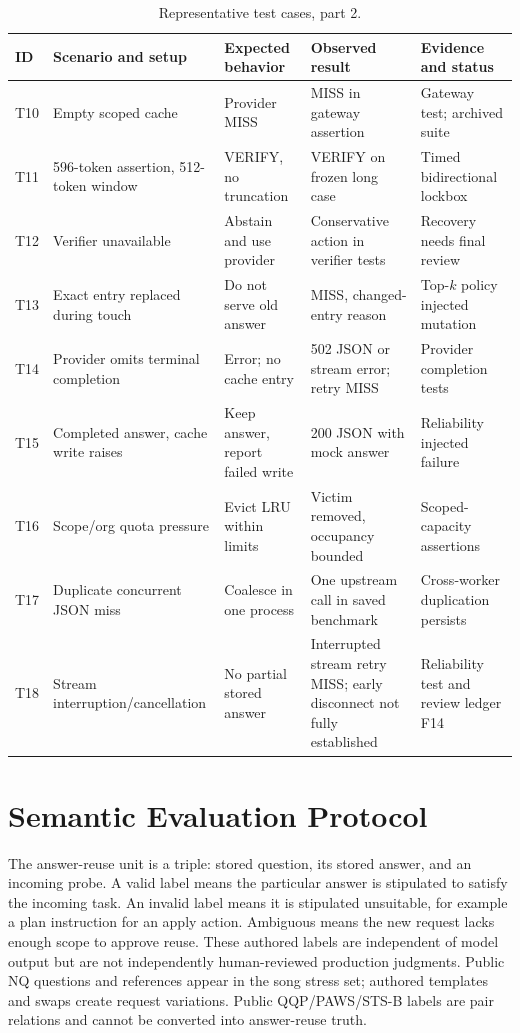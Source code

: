 \begin{table}[p]\centering\footnotesize
\caption{Representative test cases, part 2.}\label{tab:representative_cases_b}
\begin{tabular}{p{0.8cm}p{2.4cm}p{2.6cm}p{2.5cm}p{3.3cm}}
\toprule ID & Scenario and setup & Expected behavior & Observed result & Evidence and status \\\midrule
T10 & Empty scoped cache & Provider MISS & MISS in gateway assertion & Gateway test; archived suite \\
T11 & 596-token assertion, 512-token window & VERIFY, no truncation & VERIFY on frozen long case & Timed bidirectional lockbox \\
T12 & Verifier unavailable & Abstain and use provider & Conservative action in verifier tests & Recovery needs final review \\
T13 & Exact entry replaced during touch & Do not serve old answer & MISS, changed-entry reason & Top-$k$ policy injected mutation \\
T14 & Provider omits terminal completion & Error; no cache entry & 502 JSON or stream error; retry MISS & Provider completion tests \\
T15 & Completed answer, cache write raises & Keep answer, report failed write & 200 JSON with mock answer & Reliability injected failure \\
T16 & Scope/org quota pressure & Evict LRU within limits & Victim removed, occupancy bounded & Scoped-capacity assertions \\
T17 & Duplicate concurrent JSON miss & Coalesce in one process & One upstream call in saved benchmark & Cross-worker duplication persists \\
T18 & Stream interruption/cancellation & No partial stored answer & Interrupted stream retry MISS; early disconnect not fully established & Reliability test and review ledger F14 \\
\bottomrule
\end{tabular}
\end{table}


\section{Semantic Evaluation Protocol}
The answer-reuse unit is a triple: stored question, its stored answer, and an incoming probe. A valid label means the particular answer is stipulated to satisfy the incoming task. An invalid label means it is stipulated unsuitable, for example a plan instruction for an apply action. Ambiguous means the new request lacks enough scope to approve reuse. These authored labels are independent of model output but are not independently human-reviewed production judgments. Public NQ questions and references appear in the song stress set; authored templates and swaps create request variations. Public QQP/PAWS/STS-B labels are pair relations and cannot be converted into answer-reuse truth.

